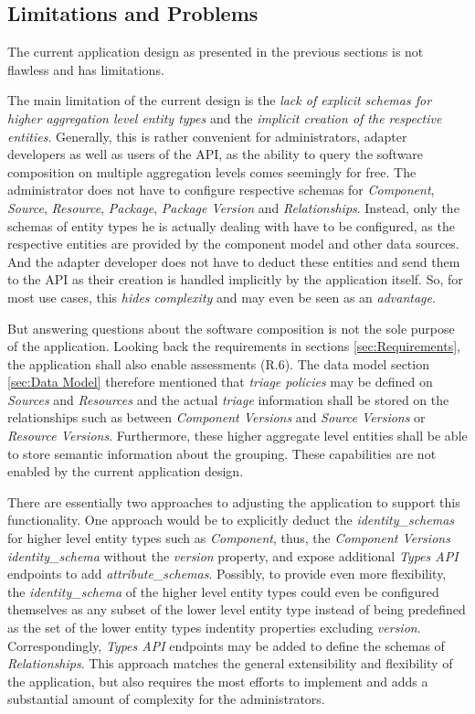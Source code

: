 \subsection{Limitations and Problems} \label{sec:Limitations and Problems}
The current application design as presented in the previous sections is not flawless and has limitations.\par 
The main limitation of the current design is the \emph{lack of explicit schemas for higher aggregation level entity types} and the \emph{implicit creation of the respective entities}. Generally, this is rather convenient for administrators, adapter developers as well as users of the API, as the ability to query the software composition on multiple aggregation levels comes seemingly for free. The administrator does not have to configure respective schemas for \emph{Component}, \emph{Source}, \emph{Resource}, \emph{Package}, \emph{Package Version} and \emph{Relationships}. Instead, only the schemas of entity types he is actually dealing with have to be configured, as the respective entities are provided by the component model and other data sources. And the adapter developer does not have to deduct these entities and send them to the API as their creation is handled implicitly by the application itself. So, for most use cases, this \emph{hides complexity} and may even be seen as an \emph{advantage}.\par
But answering questions about the software composition is not the sole purpose of the application. Looking back the requirements in sections \ref{sec:Requirements}, the application shall also enable assessments (R.6). The data model section \ref{sec:Data Model} therefore mentioned that \emph{triage policies} may be defined on \emph{Sources} and \emph{Resources} and the actual \emph{triage} information shall be stored on the relationships such as between \emph{Component Versions} and \emph{Source Versions} or \emph{Resource Versions}. Furthermore, these higher aggregate level entities shall be able to store semantic information about the grouping. These capabilities are not enabled by the current application design.\par
There are essentially two approaches to adjusting the application to support this functionality. One approach would be to explicitly deduct the \emph{identity\_schemas} for higher level entity types such as \emph{Component}, thus, the \emph{Component Versions} \emph{identity\_schema} without the \emph{version} property, and expose additional \emph{Types API} endpoints to add \emph{attribute\_schemas}. Possibly, to provide even more flexibility, the \emph{identity\_schema} of the higher level entity types could even be configured themselves as any subset of the lower level entity type instead of being predefined as the set of the lower entity types indentity properties excluding \emph{version}. Correspondingly, \emph{Types API} endpoints may be added to define the schemas of \emph{Relationships}. This approach matches the general extensibility and flexibility of the application, but also requires the most efforts to implement and adds a substantial amount of complexity for the administrators.\par
